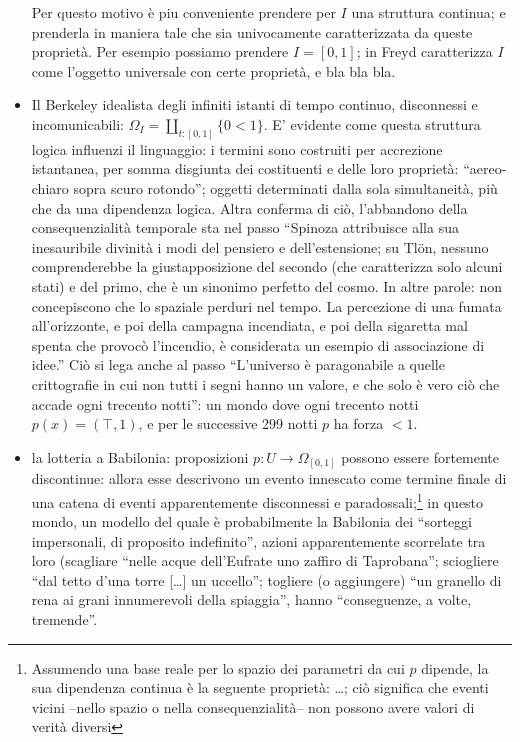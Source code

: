 \documentclass{amsart}
\begin{document}
\begin{itemize}
        Per questo motivo è piu conveniente prendere per $I$ una struttura continua; e prenderla in maniera tale che sia univocamente caratterizzata da queste proprietà. Per esempio possiamo prendere $I=[0,1]$; in \cite{} Freyd caratterizza $I$ come l'oggetto universale con certe proprietà, e bla bla bla.
  \item Il Berkeley idealista degli infiniti istanti di tempo continuo, disconnessi e incomunicabili: $\Omega_I = \coprod_{t : [0,1]} \{ 0 < 1 \}$. E' evidente come questa struttura logica influenzi il linguaggio: i termini sono costruiti per accrezione istantanea, per somma disgiunta dei costituenti e delle loro proprietà: ``aereo-chiaro sopra scuro rotondo''; oggetti determinati dalla sola simultaneità, più che da una dipendenza logica. Altra conferma di ciò, l'abbandono della consequenzialità temporale sta nel passo ``Spinoza attribuisce alla sua inesauribile divinità i modi del pensiero e dell'estensione; su Tlön, nessuno comprenderebbe la giustapposizione del  secondo (che caratterizza solo alcuni stati) e del primo, che è un sinonimo  perfetto del cosmo. In altre parole: non concepiscono che lo spaziale perduri  nel tempo. La percezione di una fumata all'orizzonte, e poi della campagna  incendiata, e poi della sigaretta mal spenta che provocò l'incendio, è  considerata un esempio di associazione di idee.'' Ciò si lega anche al passo ``L'universo è paragonabile a quelle crittografie in cui non tutti i segni hanno un valore, e che solo è vero ciò che accade ogni trecento notti'': un mondo dove ogni trecento notti $p(x) =(\top,1)$, e per le successive 299 notti $p$ ha forza $<1$.
  \item la lotteria a Babilonia: proposizioni $p : U \to \Omega_{[0,1]}$ possono essere fortemente discontinue: allora esse descrivono un evento innescato come termine finale di una catena di eventi apparentemente disconnessi e paradossali;\footnote{Assumendo una base reale per lo spazio dei parametri da cui $p$ dipende, la sua dipendenza continua è la seguente proprietà: \dots; ciò significa che eventi vicini --nello spazio o nella consequenzialità-- non possono avere valori di verità diversi} in questo mondo, un modello del quale è probabilmente la Babilonia dei ``sorteggi impersonali, di proposito indefinito'', azioni apparentemente scorrelate tra loro (scagliare ``nelle acque dell'Eufrate uno zaffiro di Taprobana''; sciogliere ``dal tetto d'una torre [\dots\unkern] un uccello''; togliere (o aggiungere) ``un granello di rena ai grani innumerevoli della spiaggia'', hanno ``conseguenze, a volte, tremende''.

\end{itemize}
\end{document}
